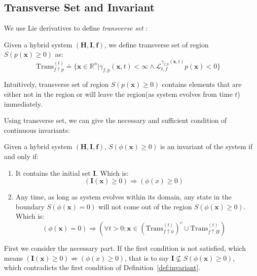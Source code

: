 \documentclass{jssc}
\begin{document}
\subsection{Transverse Set and Invariant}
We use Lie derivatives to define \emph{transverse set} :

\begin{definition}
\label{def:trans}
	Given a hybrid system $(\boldsymbol{H}, \boldsymbol{I}, \boldsymbol{f})$, we define transverse set of region $S(p(\boldsymbol{x}) \geq 0)$ as:
	\begin{equation*}
		\mathrm{Trans}_{f \uparrow p}^{(t)} \doteq \{\boldsymbol{x} \in \mathbb{R}^n | \gamma_{f, p}(\boldsymbol{x}, t) < \infty \wedge \mathcal{L}_{t, f}^{\gamma_{f, p}(\boldsymbol{x}, t)} p(\boldsymbol{x}) < 0 \}
	\end{equation*}
\end{definition}

Intuitively, transverse set of region $S(p(\boldsymbol{x}) \geq 0)$ contains elements that are either not in the region or will leave the region(as system evolves from time $t$) immediately.

Using transverse set, we can give the necessary and sufficient condition of continuous invariants:

\begin{theorem}
\label{thm:trans}
Given a hybrid system $(\boldsymbol{H}, \boldsymbol{I}, \boldsymbol{f})$, $S(\phi(\boldsymbol{x}) \geq 0)$ is an invariant of the system if and only if:
	\begin{enumerate}
		\item It contains the initial set $\boldsymbol{I}$. Which is:
			\begin{equation*}
				(\boldsymbol{I}(\boldsymbol{x}) \geq 0) \Rightarrow (\phi(x) \geq 0)
			\end{equation*}
		\item Any time, as long as system evolves within its domain, any state in the boundary $S(\phi(\boldsymbol{x}) = 0)$ will not come out of the region $S(\phi(\boldsymbol{x}) \geq 0)$. Which is:
			\begin{equation*}
				(\phi(\boldsymbol{x}) = 0) \Rightarrow (\forall t>0: \boldsymbol{x} \in (\mathrm{Trans}_{f \uparrow \phi}^{(t)})^c \cup \mathrm{Trans}_{f \uparrow H}^{(t)})
			\end{equation*}
	\end{enumerate}
\end{theorem}

\proof
First we consider the necessary part. If the first condition is not satisfied, which means $(\boldsymbol{I}(\boldsymbol{x}) \geq 0) \nRightarrow (\phi(x) \geq 0)$, that is to say $\boldsymbol{I} \not\subseteq S(\phi(\boldsymbol{x}) \geq 0)$, which contradicts the first condition of Definition~\ref{def:invariant}.
\end{document}
